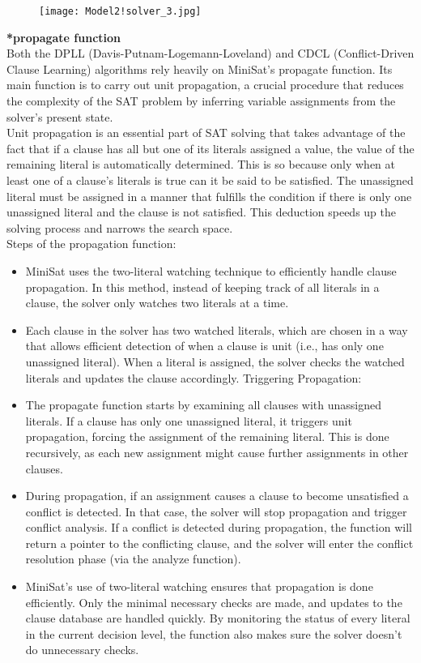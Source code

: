 \documentclass[runningheads]{llncs}
\begin{document}
\begin{figure}[h] 
    \centering
    \texttt{[image: Model2!solver\_3.jpg]} 
    \label{fig:sample}
\end{figure}
\newpage
\textbf{*propagate function}
\\
Both the DPLL (Davis-Putnam-Logemann-Loveland) and CDCL (Conflict-Driven Clause Learning) algorithms rely heavily on MiniSat's propagate function. Its main function is to carry out unit propagation, a crucial procedure that reduces the complexity of the SAT problem by inferring variable assignments from the solver's present state.\\
Unit propagation is an essential part of SAT solving that takes advantage of the fact that if a clause has all but one of its literals assigned a value, the value of the remaining literal is automatically determined. This is so because only when at least one of a clause's literals is true can it be said to be satisfied. The unassigned literal must be assigned in a manner that fulfills the condition if there is only one unassigned literal and the clause is not satisfied. This deduction speeds up the solving process and narrows the search space.
\\
Steps of the propagation function:
\begin{itemize}
\item MiniSat uses the two-literal watching technique to efficiently handle clause propagation. In this method, instead of keeping track of all literals in a clause, the solver only watches two literals at a time. 
\item Each clause in the solver has two watched literals, which are chosen in a way that allows efficient detection of when a clause is unit (i.e., has only one unassigned literal). When a literal is assigned, the solver checks the watched literals and updates the clause accordingly.
Triggering Propagation:

\item The propagate function starts by examining all clauses with unassigned literals. If a clause has only one unassigned literal, it triggers unit propagation, forcing the assignment of the remaining literal. This is done recursively, as each new assignment might cause further assignments in other clauses.

\item During propagation, if an assignment causes a clause to become unsatisfied a conflict is detected. In that case, the solver will stop propagation and trigger conflict analysis. If a conflict is detected during propagation, the function will return a pointer to the conflicting clause, and the solver will enter the conflict resolution phase (via the analyze function).

\item MiniSat's use of two-literal watching ensures that propagation is done efficiently. Only the minimal necessary checks are made, and updates to the clause database are handled quickly.
By monitoring the status of every literal in the current decision level, the function also makes sure the solver doesn't do unnecessary checks.
\end{itemize}
\end{document}
